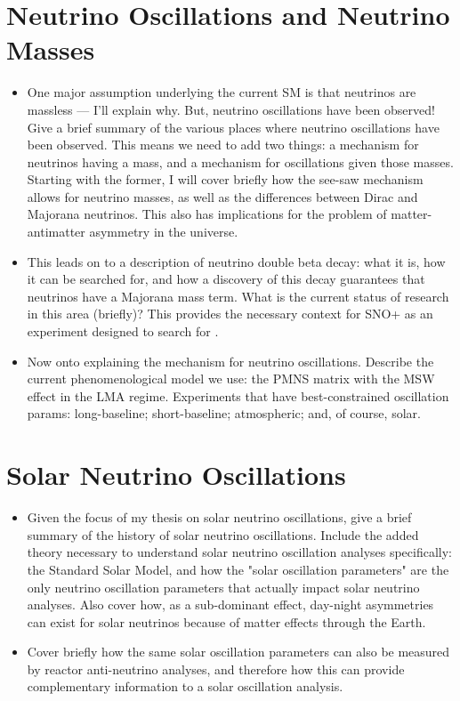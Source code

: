 \section{Neutrino Oscillations and Neutrino Masses}
\begin{itemize}
    \item One major assumption underlying the current SM is that neutrinos are massless --- I'll explain why. But, neutrino oscillations have been observed! Give a brief summary of the various places where neutrino oscillations have been observed. This means we need to add two things: a mechanism for neutrinos having a mass, and a mechanism for oscillations given those masses. Starting with the former, I will cover briefly how the see-saw mechanism allows for neutrino masses, as well as the differences between Dirac and Majorana neutrinos. This also has implications for the problem of matter-antimatter asymmetry in the universe.
    \item This leads on to a description of neutrino double beta decay: what it is, how it can be searched for, and how a discovery of this decay guarantees that neutrinos have a Majorana mass term. What is the current status of research in this area (briefly)? This provides the necessary context for SNO+ as an experiment designed to search for \onbb{}.
    \item Now onto explaining the mechanism for neutrino oscillations. Describe the current phenomenological model we use: the PMNS matrix with the MSW effect in the LMA regime. Experiments that have best-constrained oscillation params: long-baseline; short-baseline; atmospheric; and, of course, solar.
\end{itemize}
\section{Solar Neutrino Oscillations}
\begin{itemize}
    \item Given the focus of my thesis on solar neutrino oscillations, give a brief summary of the history of solar neutrino oscillations. Include the added theory necessary to understand solar neutrino oscillation analyses specifically: the Standard Solar Model, and how the "solar oscillation parameters" are the only neutrino oscillation parameters that actually impact solar neutrino analyses. Also cover how, as a sub-dominant effect, day-night asymmetries can exist for solar neutrinos because of matter effects through the Earth.
    \item Cover briefly how the same solar oscillation parameters can also be measured by reactor anti-neutrino analyses, and therefore how this can provide complementary information to a solar oscillation analysis.
\end{itemize}